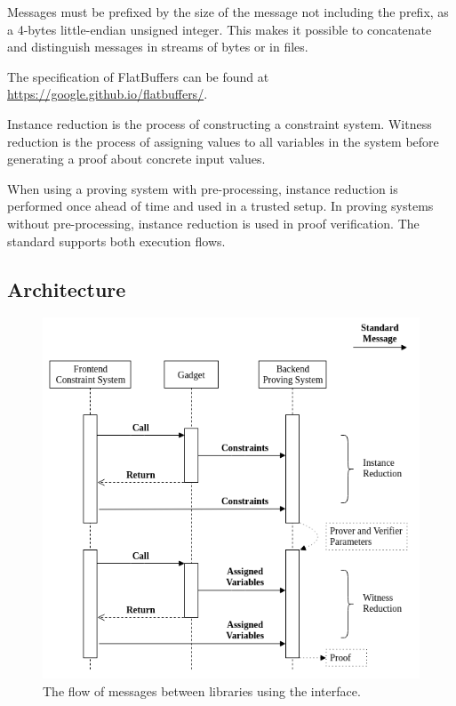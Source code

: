 	Messages must be prefixed by the size of the message not including the prefix,
	as a 4-bytes little-endian unsigned integer.
	This makes it possible to concatenate and distinguish messages
	in streams of bytes or in files.

	The specification of FlatBuffers can be found at
	\href{https://google.github.io/flatbuffers/}{https://google.github.io/flatbuffers/}.



	Instance reduction is the process of constructing a constraint system.
	Witness reduction is the process of assigning values to all variables
	in the system before generating a proof about concrete input values.

	When using a proving system with pre-processing, instance reduction
	is performed once ahead of time and used in a trusted setup.
	In proving systems without pre-processing, instance reduction is used in proof verification.
	The standard supports both execution flows.


\subsection{Architecture}

\begin{figure}[!h]
	\centering
	\includegraphics[width=\linewidth]{graphics/call_flow.png}
	\caption{The flow of messages between libraries using the interface.}
	\label{flow}
\end{figure}

